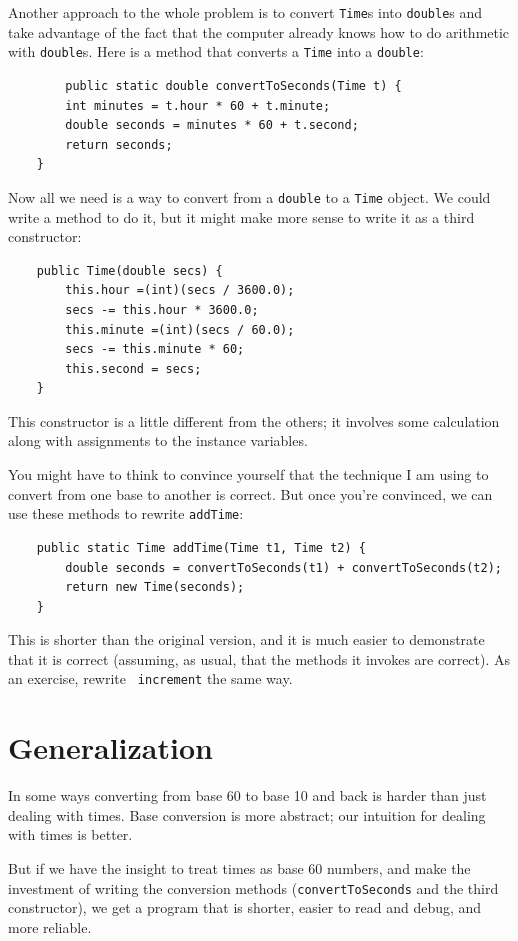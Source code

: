 Another approach to the whole problem is to convert
{\tt Time}s into {\tt double}s and take advantage of the fact that
the computer already knows how to do arithmetic with {\tt double}s.
Here is a method that converts a {\tt Time} into a {\tt double}:

\begin{lstlisting}
        public static double convertToSeconds(Time t) {
        int minutes = t.hour * 60 + t.minute;
        double seconds = minutes * 60 + t.second;
        return seconds;
    }
\end{lstlisting}
%
Now all we need is a way to convert from a {\tt double}
to a {\tt Time} object.  We could write a method to
do it, but it might make more sense to write it as a third
constructor:

\begin{lstlisting}
    public Time(double secs) {
        this.hour =(int)(secs / 3600.0);
        secs -= this.hour * 3600.0;
        this.minute =(int)(secs / 60.0);
        secs -= this.minute * 60;
        this.second = secs;
    }
\end{lstlisting}
%
This constructor is a little different from the others;
it involves some calculation along with assignments to the
instance variables.

You might have to think to convince yourself that the technique
I am using to convert from one base to another is correct.  But once
you're convinced, we can use these methods to rewrite {\tt addTime}:

\begin{lstlisting}
    public static Time addTime(Time t1, Time t2) {
        double seconds = convertToSeconds(t1) + convertToSeconds(t2);
        return new Time(seconds);
    }
\end{lstlisting}
%
This is shorter than the original version, and it is much easier
to demonstrate that it is correct (assuming, as usual, that the
methods it invokes are correct).  As an exercise, rewrite {\tt
increment} the same way.


\section{Generalization}

In some ways converting from base 60 to base 10 and back is
harder than just dealing with times.  Base conversion is more
abstract; our intuition for dealing with times is better.

But if we have the insight to treat times as base 60 numbers,
and make the investment of writing the conversion methods
({\tt convertToSeconds} and the third constructor), we get
a program that is shorter, easier to read and debug, and more
reliable.

